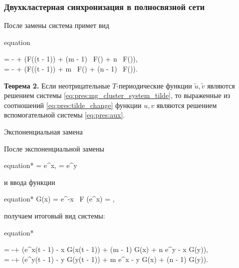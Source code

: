 \begin{frame}
	\frametitle{Двухкластерная синхронизация в полносвязной сети}
	
	После замены система примет вид
	\small
	\begin{empheq}[box=\myeq]{equation}
		\label{eq:pres:mg_cluster_system_tilde}
		\begin{cases}
			 = -\beta {} + \alpha \big(F((t - 1)) + \delta (m - 1) \, F() + \delta n \, F()\big),\\
			 = -\beta {} + \alpha \big(F((t - 1)) + \delta m \, F() + \delta (n - 1) \, F()\big).
		\end{cases}
	\end{empheq}
	\normalsize
	
	
	\textbf{Теорема 2.} Если неотрицательные $T$-периодические функции $\tilde{u}, \tilde{v}$ являются решением системы \eqref{eq:pres:mg_cluster_system_tilde}, то выраженные из соотношений \eqref{eq:pres:tilde_change} функции $u, v$ являются решением вспомогательной системы \eqref{eq:pres:aux}.
\end{frame}

\begin{frame}{Экспоненциальная замена}
	
	После экспоненциальной замены
	\begin{empheq}[box=\myeq]{equation*}
		 = e^x, \quad {} = e^y
	\end{empheq}
	и ввода функции 
	\begin{empheq}[box=\myeq]{equation*}
		G(x) = e^{-x} \, F (e^x) = \dfrac{1}{1 + e^{\gamma x}},
	\end{empheq}
	получаем итоговый вид системы:
	\footnotesize
	\begin{empheq}[box=\myeq]{equation*}
		\begin{cases}
			 = -\beta + \alpha \left(e^{x(t - 1) - x} G(x(t - 1)) + \delta (m - 1) G(x) + \delta n e^{y - x} G(y)\right),\\
			 = -\beta + \alpha \left(e^{y(t - 1) - y} G(y(t - 1)) + \delta m e^{x - y} G(x) + \delta (n - 1) G(y)\right).
		\end{cases}
	\end{empheq}
	\normalsize
\end{frame}

